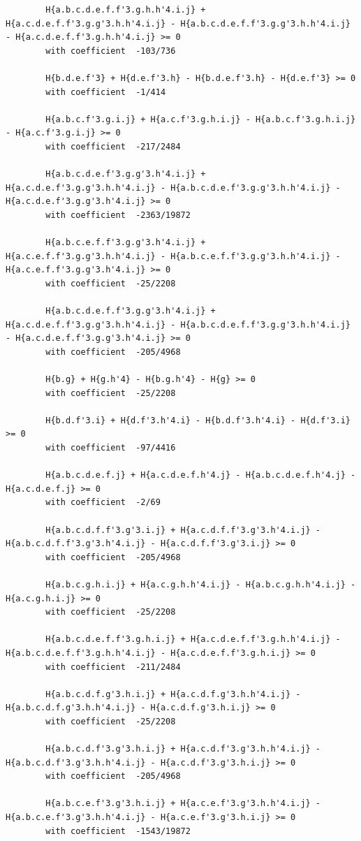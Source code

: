 \documentclass[11pt, a4paper]{kybernetika}
\begin{document}
\begin{verbatim}
		H{a.b.c.d.e.f.f'3.g.h.h'4.i.j} + H{a.c.d.e.f.f'3.g.g'3.h.h'4.i.j} - H{a.b.c.d.e.f.f'3.g.g'3.h.h'4.i.j} - H{a.c.d.e.f.f'3.g.h.h'4.i.j} >= 0
		with coefficient  -103/736
		
		H{b.d.e.f'3} + H{d.e.f'3.h} - H{b.d.e.f'3.h} - H{d.e.f'3} >= 0
		with coefficient  -1/414
		
		H{a.b.c.f'3.g.i.j} + H{a.c.f'3.g.h.i.j} - H{a.b.c.f'3.g.h.i.j} - H{a.c.f'3.g.i.j} >= 0
		with coefficient  -217/2484
		
		H{a.b.c.d.e.f'3.g.g'3.h'4.i.j} + H{a.c.d.e.f'3.g.g'3.h.h'4.i.j} - H{a.b.c.d.e.f'3.g.g'3.h.h'4.i.j} - H{a.c.d.e.f'3.g.g'3.h'4.i.j} >= 0
		with coefficient  -2363/19872
		
		H{a.b.c.e.f.f'3.g.g'3.h'4.i.j} + H{a.c.e.f.f'3.g.g'3.h.h'4.i.j} - H{a.b.c.e.f.f'3.g.g'3.h.h'4.i.j} - H{a.c.e.f.f'3.g.g'3.h'4.i.j} >= 0
		with coefficient  -25/2208
		
		H{a.b.c.d.e.f.f'3.g.g'3.h'4.i.j} + H{a.c.d.e.f.f'3.g.g'3.h.h'4.i.j} - H{a.b.c.d.e.f.f'3.g.g'3.h.h'4.i.j} - H{a.c.d.e.f.f'3.g.g'3.h'4.i.j} >= 0
		with coefficient  -205/4968
		
		H{b.g} + H{g.h'4} - H{b.g.h'4} - H{g} >= 0
		with coefficient  -25/2208
		
		H{b.d.f'3.i} + H{d.f'3.h'4.i} - H{b.d.f'3.h'4.i} - H{d.f'3.i} >= 0
		with coefficient  -97/4416
		
		H{a.b.c.d.e.f.j} + H{a.c.d.e.f.h'4.j} - H{a.b.c.d.e.f.h'4.j} - H{a.c.d.e.f.j} >= 0
		with coefficient  -2/69
		
		H{a.b.c.d.f.f'3.g'3.i.j} + H{a.c.d.f.f'3.g'3.h'4.i.j} - H{a.b.c.d.f.f'3.g'3.h'4.i.j} - H{a.c.d.f.f'3.g'3.i.j} >= 0
		with coefficient  -205/4968
		
		H{a.b.c.g.h.i.j} + H{a.c.g.h.h'4.i.j} - H{a.b.c.g.h.h'4.i.j} - H{a.c.g.h.i.j} >= 0
		with coefficient  -25/2208
		
		H{a.b.c.d.e.f.f'3.g.h.i.j} + H{a.c.d.e.f.f'3.g.h.h'4.i.j} - H{a.b.c.d.e.f.f'3.g.h.h'4.i.j} - H{a.c.d.e.f.f'3.g.h.i.j} >= 0
		with coefficient  -211/2484
		
		H{a.b.c.d.f.g'3.h.i.j} + H{a.c.d.f.g'3.h.h'4.i.j} - H{a.b.c.d.f.g'3.h.h'4.i.j} - H{a.c.d.f.g'3.h.i.j} >= 0
		with coefficient  -25/2208
		
		H{a.b.c.d.f'3.g'3.h.i.j} + H{a.c.d.f'3.g'3.h.h'4.i.j} - H{a.b.c.d.f'3.g'3.h.h'4.i.j} - H{a.c.d.f'3.g'3.h.i.j} >= 0
		with coefficient  -205/4968
		
		H{a.b.c.e.f'3.g'3.h.i.j} + H{a.c.e.f'3.g'3.h.h'4.i.j} - H{a.b.c.e.f'3.g'3.h.h'4.i.j} - H{a.c.e.f'3.g'3.h.i.j} >= 0
		with coefficient  -1543/19872
		

\end{verbatim}
\end{document}
